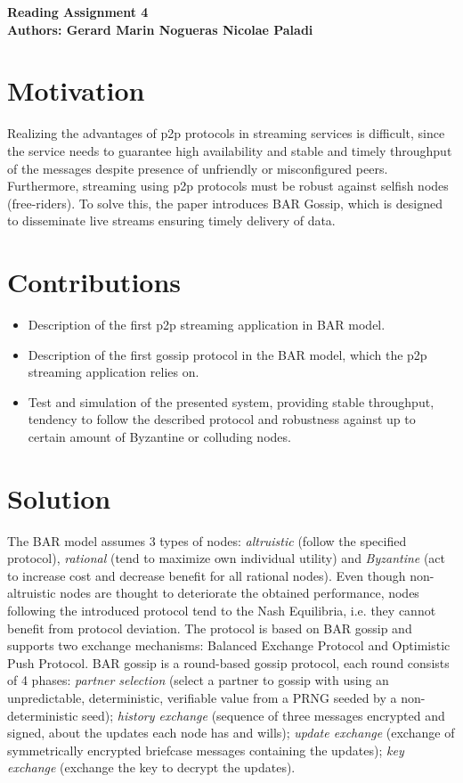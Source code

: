\documentclass[10pt]{proc}
\begin{document}
\large{\textbf{Reading Assignment 4}}\\
\large{\textbf{Authors: Gerard Marin Nogueras \newline Nicolae Paladi}}\\
\section{Motivation}
Realizing the advantages of p2p protocols in streaming services is difficult, since the service needs to guarantee high availability and stable and timely throughput of the messages despite
presence of unfriendly or misconfigured peers. Furthermore, streaming using p2p protocols must be robust against selfish nodes (free-riders).
To solve this, the paper introduces  BAR Gossip, which is designed to disseminate live streams ensuring timely delivery of data.
\section{Contributions}
\begin{itemize}
\item Description of the first p2p streaming application in BAR model.
\item Description of the first gossip protocol in the BAR model, which the p2p streaming application relies on.
\item Test and simulation of the presented system, providing stable throughput, tendency to follow the described protocol and robustness against up to certain amount of Byzantine or colluding nodes.
\end{itemize}


\section{Solution}
The BAR model assumes 3 types of nodes: \emph{altruistic} (follow the specified protocol), \emph{rational} (tend to maximize own individual utility) and \emph{Byzantine} (act to increase cost and decrease  benefit for all rational nodes). Even though non-altruistic nodes are thought to deteriorate the obtained performance, nodes following the introduced protocol tend to the Nash Equilibria, i.e. they cannot benefit from protocol deviation. The protocol is based on BAR gossip and supports two exchange mechanisms: Balanced Exchange Protocol and Optimistic Push Protocol. 
BAR gossip is a round-based gossip protocol, each round consists of 4 phases: \emph{partner selection} (select a partner to gossip with using an unpredictable, deterministic, verifiable value from a PRNG seeded by a non-deterministic seed); \emph{history exchange} (sequence of three messages encrypted and signed, about the updates each node has and wills); \emph {update exchange} (exchange of symmetrically encrypted briefcase messages containing the updates); \emph{key exchange} (exchange the key to decrypt the updates). 
\end{document}
